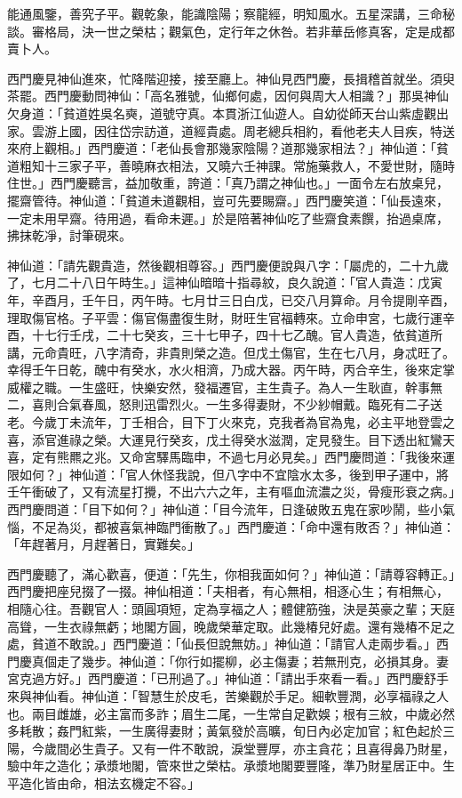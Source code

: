 能通風鑒，善究子平。觀乾象，能識陰陽；察龍經，明知風水。五星深講，三命秘談。審格局，決一世之榮枯；觀氣色，定行年之休咎。若非華岳修真客，定是成都賣卜人。

西門慶見神仙進來，忙降階迎接，接至廳上。神仙見西門慶，長揖稽首就坐。須臾茶罷。西門慶動問神仙：「高名雅號，仙鄉何處，因何與周大人相識？」那吳神仙欠身道：「貧道姓吳名奭，道號守真。本貫浙江仙遊人。自幼從師天台山紫虛觀出家。雲游上國，因往岱宗訪道，道經貴處。周老總兵相約，看他老夫人目疾，特送來府上觀相。」西門慶道：「老仙長會那幾家陰陽？道那幾家相法？」神仙道：「貧道粗知十三家子平，善曉麻衣相法，又曉六壬神課。常施藥救人，不愛世財，隨時住世。」西門慶聽言，益加敬重，誇道：「真乃謂之神仙也。」一面令左右放桌兒，擺齋管待。神仙道：「貧道未道觀相，豈可先要賜齋。」西門慶笑道：「仙長遠來，一定未用早齋。待用過，看命未遲。」於是陪著神仙吃了些齋食素饌，抬過桌席，拂抹乾凈，討筆硯來。

神仙道：「請先觀貴造，然後觀相尊容。」西門慶便說與八字：「屬虎的，二十九歲了，七月二十八日午時生。」這神仙暗暗十指尋紋，良久說道：「官人貴造：戊寅年，辛酉月，壬午日，丙午時。七月廿三日白戊，已交八月算命。月令提剛辛酉，理取傷官格。子平雲：傷官傷盡復生財，財旺生官福轉來。立命申宮，七歲行運辛酉，十七行壬戌，二十七癸亥，三十七甲子，四十七乙醜。官人貴造，依貧道所講，元命貴旺，八字清奇，非貴則榮之造。但戊土傷官，生在七八月，身忒旺了。幸得壬午日乾，醜中有癸水，水火相濟，乃成大器。丙午時，丙合辛生，後來定掌威權之職。一生盛旺，快樂安然，發福遷官，主生貴子。為人一生耿直，幹事無二，喜則合氣春風，怒則迅雷烈火。一生多得妻財，不少紗帽戴。臨死有二子送老。今歲丁未流年，丁壬相合，目下丁火來克，克我者為官為鬼，必主平地登雲之喜，添官進祿之榮。大運見行癸亥，戊土得癸水滋潤，定見發生。目下透出紅鸞天喜，定有熊羆之兆。又命宮驛馬臨申，不過七月必見矣。」西門慶問道：「我後來運限如何？」神仙道：「官人休怪我說，但八字中不宜陰水太多，後到甲子運中，將壬午衝破了，又有流星打攪，不出六六之年，主有嘔血流濃之災，骨瘦形衰之病。」西門慶問道：「目下如何？」神仙道：「目今流年，日逢破敗五鬼在家吵鬧，些小氣惱，不足為災，都被喜氣神臨門衝散了。」西門慶道：「命中還有敗否？」神仙道：「年趕著月，月趕著日，實難矣。」

西門慶聽了，滿心歡喜，便道：「先生，你相我面如何？」神仙道：「請尊容轉正。」西門慶把座兒掇了一掇。神仙相道：「夫相者，有心無相，相逐心生；有相無心，相隨心往。吾觀官人：頭圓項短，定為享福之人；體健筋強，決是英豪之輩；天庭高聳，一生衣祿無虧；地閣方圓，晚歲榮華定取。此幾椿兒好處。還有幾椿不足之處，貧道不敢說。」西門慶道：「仙長但說無妨。」神仙道：「請官人走兩步看。」西門慶真個走了幾步。神仙道：「你行如擺柳，必主傷妻；若無刑克，必損其身。妻宮克過方好。」西門慶道：「已刑過了。」神仙道：「請出手來看一看。」西門慶舒手來與神仙看。神仙道：「智慧生於皮毛，苦樂觀於手足。細軟豐潤，必享福祿之人也。兩目雌雄，必主富而多詐；眉生二尾，一生常自足歡娛；根有三紋，中歲必然多耗散；姦門紅紫，一生廣得妻財；黃氣發於高曠，旬日內必定加官；紅色起於三陽，今歲間必生貴子。又有一件不敢說，淚堂豐厚，亦主貪花；且喜得鼻乃財星，驗中年之造化；承漿地閣，管來世之榮枯。承漿地閣要豐隆，準乃財星居正中。生平造化皆由命，相法玄機定不容。」

